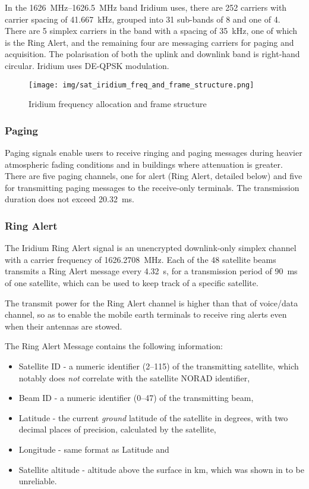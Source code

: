 In the \qtyrange{1626}{1626.5}{\MHz} band Iridium uses, there are 252 carriers with carrier spacing of \qty{41.667}{\kHz}, grouped into 31 sub-bands of 8 and one of 4. There are 5 simplex carriers in the band with a spacing of \qty{35}{\kHz}, one of which is the Ring Alert, and the remaining four are messaging carriers for paging and acquisition. The polarisation of both the uplink and downlink band is right-hand circular. Iridium uses DE-QPSK modulation\cite{sat04}.

\begin{figure}
    \centering
    \texttt{[image: img/sat\_iridium\_freq\_and\_frame\_structure.png]}
    \caption{Iridium frequency allocation and frame structure\cite{sop12}}
    \label{f_sat_iridium_freq_and_frame_structure}
\end{figure}

\subsubsection{Paging}
Paging signals enable users to receive ringing and paging messages during heavier atmospheric fading conditions and in buildings where attenuation is greater. There are five paging channels, one for alert (Ring Alert, detailed below) and five for transmitting paging messages to the receive-only terminals.  The transmission duration does not exceed \qty{20.32}{\ms}\cite{sat09}.

\subsubsection{Ring Alert}
The Iridium Ring Alert signal is an unencrypted downlink-only simplex channel with a carrier frequency of \qty{1626.2708}{\MHz}\cite{sat04}. Each of the 48 satellite beams transmits a Ring Alert message every \qty{4.32}{\s}, for a transmission period of \qty{90}{\ms} of one satellite\cite{sat07}, which can be used to keep track of a specific satellite\cite{sop11}.

The transmit power for the Ring Alert channel is higher than that of voice/data channel, so as to enable the mobile earth terminals to receive ring alerts even when their antennas are stowed\cite{sat09}.

The Ring Alert Message contains the following information\cite{sat08}:
\begin{itemize}
    \item Satellite ID - a numeric identifier (\numrange{2}{115}) of the transmitting satellite, which notably does \emph{not} correlate with the satellite NORAD identifier,
    \item Beam ID - a numeric identifier (\numrange{0}{47}) of the transmitting beam,
    \item Latitude - the current \emph{ground} latitude of the satellite in degrees, with two decimal places of precision, calculated by the satellite,
    \item Longitude - same format as Latitude and
    \item Satellite altitude - altitude above the surface in \unit{\km}, which was shown in \cite{sat08} to be unreliable.
\end{itemize}

